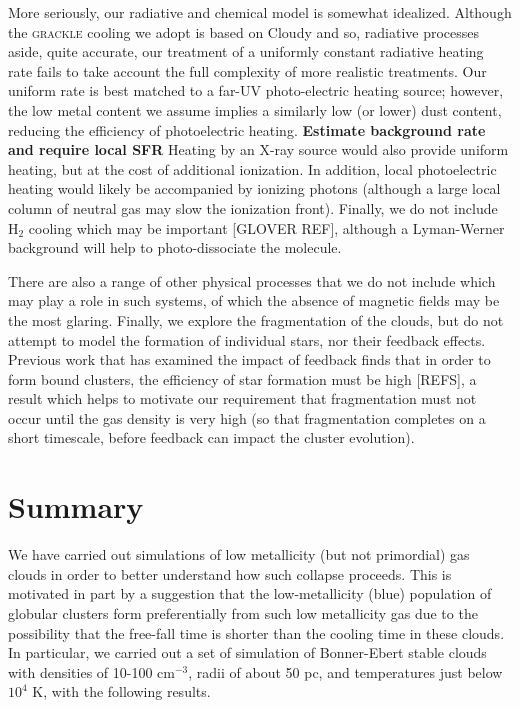 \documentclass[useAMS,usenatbib]{mn2e}
\begin{document}
More seriously, our radiative and chemical model is somewhat idealized.  Although the \textsc{grackle} cooling we adopt is based on Cloudy and so, radiative processes aside, quite accurate, our treatment of a uniformly constant radiative heating rate fails to take account the full complexity of more realistic treatments.  Our uniform rate is best matched to a far-UV photo-electric heating source; however, the low metal content we assume implies a similarly low (or lower) dust content, reducing the efficiency of photoelectric heating. {\bf Estimate background rate and require local SFR}  Heating by an X-ray source would also provide uniform heating, but at the cost of additional ionization.  In addition, local photoelectric heating would likely be accompanied by ionizing photons (although a large local column of neutral gas may slow the ionization front).  Finally, we do not include H$_2$ cooling which may be important [GLOVER REF], although a Lyman-Werner background will help to photo-dissociate the molecule.

There are also a range of other physical processes that we do not include which may play a role in such systems, of which the absence of magnetic fields may be the most glaring.  Finally, we explore the fragmentation of the clouds, but do not attempt to model the formation of individual stars, nor their feedback effects.  Previous work that has examined the impact of feedback finds that in order to form bound clusters, the efficiency of star formation must be high [REFS], a result which helps to motivate our requirement that fragmentation must not occur until the gas density is very high (so that fragmentation completes on a short timescale, before feedback can impact the cluster evolution).

% 
\section{Summary}

We have carried out simulations of low metallicity (but not primordial) gas clouds in order to better understand  how such collapse proceeds.  This is motivated in part by a suggestion that the low-metallicity (blue) population of globular clusters form preferentially from such low metallicity gas due to the possibility that the free-fall time is shorter than the cooling time in these clouds.  In particular, we carried out a set of simulation of Bonner-Ebert stable clouds with densities of 10-100 cm$^{-3}$, radii of about 50 pc, and temperatures just below $10^4$ K, with the following results.
\end{document}
